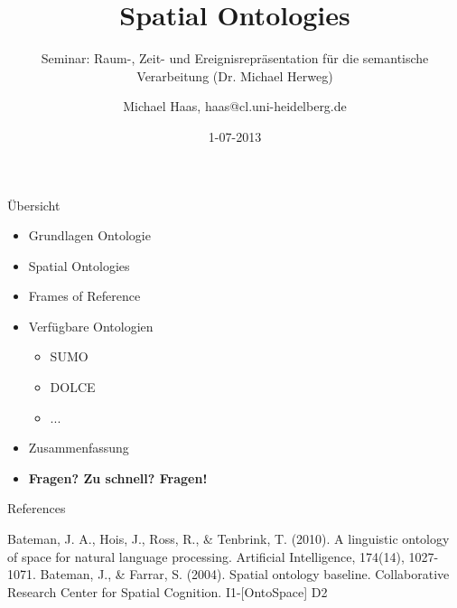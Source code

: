 \documentclass[12pt,a4paper]{beamer}
\author{Michael Haas, haas@cl.uni-heidelberg.de}
\title{Spatial Ontologies}
\subtitle{Seminar: Raum-, Zeit- und Ereignisrepräsentation für die semantische Verarbeitung (Dr. Michael Herweg)}
\date{1-07-2013}
\begin{document}
\begin{frame}
\maketitle
\end{frame}

\begin{frame}{Übersicht}
\begin{itemize}
\item Grundlagen Ontologie
\item Spatial Ontologies
\item Frames of Reference
\item Verfügbare Ontologien
\begin{itemize}
    \item SUMO
    \item DOLCE
    \item ...
\end{itemize}
\item Zusammenfassung 
\item \textbf{Fragen? Zu schnell? Fragen!}
\end{itemize}
\end{frame}




\begin{frame}[allowframebreaks]{References}
\begin{thebibliography}{-}
 Bateman, J. A., Hois, J., Ross, R., \& Tenbrink, T. (2010). A linguistic ontology of space for natural language processing. Artificial Intelligence, 174(14), 1027-1071.
 Bateman, J., \& Farrar, S. (2004). Spatial ontology baseline. Collaborative Research Center for Spatial Cognition. I1-[OntoSpace] D2
\end{thebibliography}
\end{frame}
\end{document}
